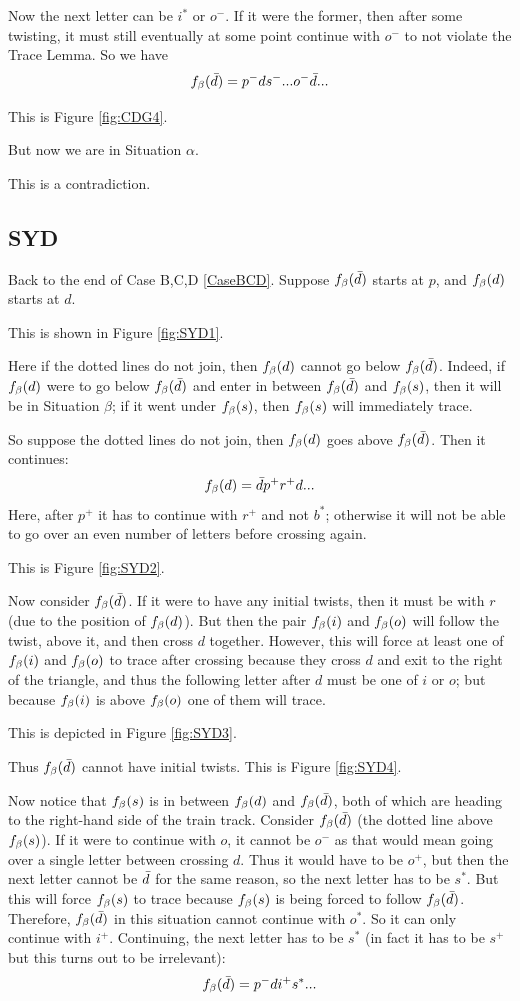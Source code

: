 Now the next letter can be $i^*$ or $o^-$. If it were the former, then after some twisting, it must still eventually at some point continue with $o^-$ to not violate the Trace Lemma. So we have
\[
f_\beta(\bar{d}) = p^- d s^-...o^- \bar{d}...
\]

This is Figure \ref{fig:CDG4}.

But now we are in Situation $\alpha$.

This is a contradiction.

\subsection{SYD} \label{SYD}
Back to the end of Case B,C,D \ref{CaseBCD}. Suppose $f_\beta(\bar{d})$ starts at $p$, and $f_\beta(d)$ starts at $d$.

This is shown in Figure \ref{fig:SYD1}.

Here if the dotted lines do not join, then $f_\beta(d)$ cannot go below $f_\beta(\bar{d})$. Indeed, if $f_\beta(d)$ were to go below $f_\beta(\bar{d})$ and enter in between $f_\beta(\bar{d})$ and $f_\beta(s)$, then it will be in Situation $\beta$; if it went under $f_\beta(s)$, then $f_\beta(s)$ will immediately trace.

So suppose the dotted lines do not join, then $f_\beta(d)$ goes above $f_\beta(\bar{d})$. Then it continues:
\[
f_\beta(d) = \bar{d} p^+ r^+ d...
\]
Here, after $p^+$ it has to continue with $r^+$ and not $b^*$; otherwise it will not be able to go over an even number of letters before crossing again. 

This is Figure \ref{fig:SYD2}.

Now consider $f_\beta(\bar{d})$. If it were to have any initial twists, then it must be with $r$ (due to the position of $f_\beta(d)$). But then the pair $f_\beta(i)$ and $f_\beta(o)$ will follow the twist, above it, and then cross $d$ together. However, this will force at least one of $f_\beta(i)$ and $f_\beta(o)$ to trace after crossing because they cross $d$ and exit to the right of the triangle, and thus the following letter after $d$ must be one of $i$ or $o$; but because $f_\beta(i)$ is above $f_\beta(o)$ one of them will trace. 

This is depicted in Figure \ref{fig:SYD3}.

Thus $f_\beta(\bar{d})$ cannot have initial twists. This is Figure \ref{fig:SYD4}.

Now notice that $f_\beta(s)$ is in between $f_\beta(d)$ and $f_\beta(\bar{d})$, both of which are heading to the right-hand side of the train track. Consider $f_\beta(\bar{d})$ (the dotted line above $f_\beta(s)$). If it were to continue with $o$, it cannot be $o^-$ as that would mean going over a single letter between crossing $d$. Thus it would have to be $o^+$, but then the next letter cannot be $\bar{d}$ for the same reason, so the next letter has to be $s^*$. But this will force $f_\beta(s)$ to trace because $f_\beta(s)$ is being forced to follow $f_\beta(\bar{d})$. Therefore, $f_\beta(\bar{d})$ in this situation cannot continue with $o^*$. So it can only continue with $i^+$. Continuing, the next letter has to be $s^*$ (in fact it has to be $s^+$ but this turns out to be irrelevant):
\[
f_\beta(\bar{d}) = p^- d i^+ s^*...
\]

